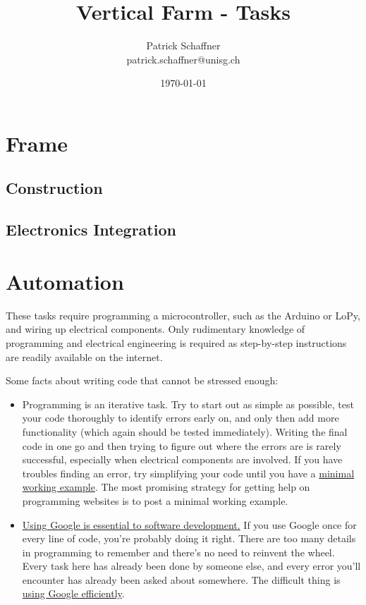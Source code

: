 \documentclass[a4paper]{article}
\title{Vertical Farm - Tasks}
\author{Patrick Schaffner\\patrick.schaffner@unisg.ch}
\date{\today}
\begin{document}
\maketitle

\section{Frame}
\subsection{Construction}
\subsection{Electronics Integration}


\section{Automation}

These tasks require programming a microcontroller,
such as the Arduino or LoPy, and wiring up electrical components.
Only rudimentary knowledge of programming and electrical engineering is required
as step-by-step instructions are readily available on the internet.

Some facts about writing code that cannot be stressed enough:
\begin{itemize}
 \item Programming is an iterative task.
  Try to start out as simple as possible, test your code thoroughly to
  identify errors early on, and only then add more functionality (which again should be
  tested immediately). Writing the final code in one go and then trying to figure
  out where the errors are is rarely successful, especially when electrical components are involved.
  If you have troubles finding an error, try simplifying your code until you have a \href{https://en.wikipedia.org/wiki/Minimal_Working_Example}{minimal working example}.
  The most promising strategy for getting help on programming websites is to post a minimal working example.
 \item \href{https://codeahoy.com/2016/04/30/do-experienced-programmers-use-google-frequently/}{Using Google
  is essential to software development.} If you use Google once for every line of code, you're probably
  doing it right. There are too many details in programming to remember and there's no need to reinvent the wheel.
  Every task here has already been done by someone else, and every error you'll encounter has already been
  asked about somewhere. The difficult thing is
  \href{https://knightlab.northwestern.edu/2014/03/13/googling-for-code-solutions-can-be-tricky-heres-how-to-get-started/}{using Google efficiently}.
\end{itemize}
\end{document}
